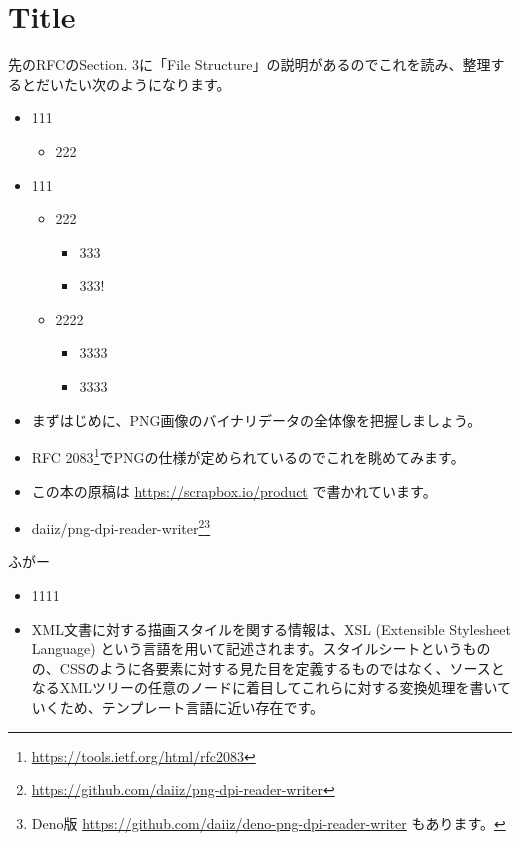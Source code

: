 \section{Title}
先のRFCのSection. 3に「File Structure」の説明があるのでこれを読み、整理するとだいたい次のようになります。
\begin{itemize}
  \item 111
  \begin{itemize}
    \item 222
  \end{itemize}
  \item 111
  \begin{itemize}
    \item 222
    \begin{itemize}
      \item 333
      \item 333!
    \end{itemize}
    \item 2222
    \begin{itemize}
      \item 3333
      \item 3333
    \end{itemize}
  \end{itemize}
\end{itemize}
\begin{itemize}
  \item まずはじめに、PNG画像のバイナリデータの全体像を把握しましょう。
  \item RFC 2083\footnote{\url{https://tools.ietf.org/html/rfc2083}}でPNGの仕様が定められているのでこれを眺めてみます。
  \item この本の原稿は \url{https://scrapbox.io/product} で書かれています。
  \item daiiz/png-dpi-reader-writer\footnote{\url{https://github.com/daiiz/png-dpi-reader-writer}}\footnote{Deno版 \url{https://github.com/daiiz/deno-png-dpi-reader-writer} もあります。}
\end{itemize}

ふがー
\begin{itemize}
  \item 1111
  \item XML文書に対する描画スタイルを関する情報は、XSL (Extensible Stylesheet Language) という言語を用いて記述されます。スタイルシートというものの、CSSのように各要素に対する見た目を定義するものではなく、ソースとなるXMLツリーの任意のノードに着目してこれらに対する変換処理を書いていくため、テンプレート言語に近い存在です。
\end{itemize}

